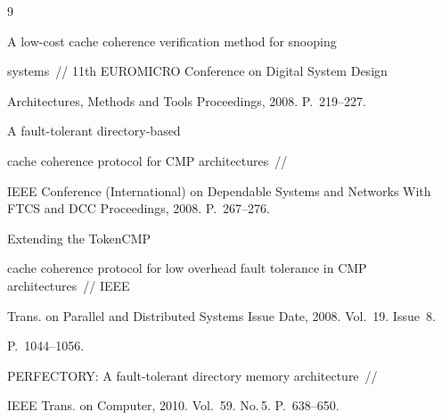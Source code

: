 {\small\frenchspacing


{%




\begin{thebibliography}{9}









A low-cost cache coherence verification method for snooping 


systems~/\!\!/ 11th EUROMICRO Conference on Digital System Design 


Architectures, Methods and Tools  Proceedings, 2008. P.~219--227.












A fault-tolerant directory-based 


cache coherence protocol for CMP architectures~/\!\!/ 


IEEE Conference (International) on Dependable Systems and Networks With FTCS and DCC Proceedings, 2008. P.~267--276.









Extending the TokenCMP 


cache coherence protocol for low overhead fault tolerance in CMP architectures~/\!\!/ IEEE 


Trans. on Parallel and Distributed Systems Issue Date, 2008. Vol.~19. Issue~8. 


P.~1044--1056.









PERFECTORY: A fault-tolerant directory memory architecture~/\!\!/ 


IEEE Trans. on Computer, 2010. Vol.~59. No.\,5. P.~638--650.






\end{thebibliography}}}
